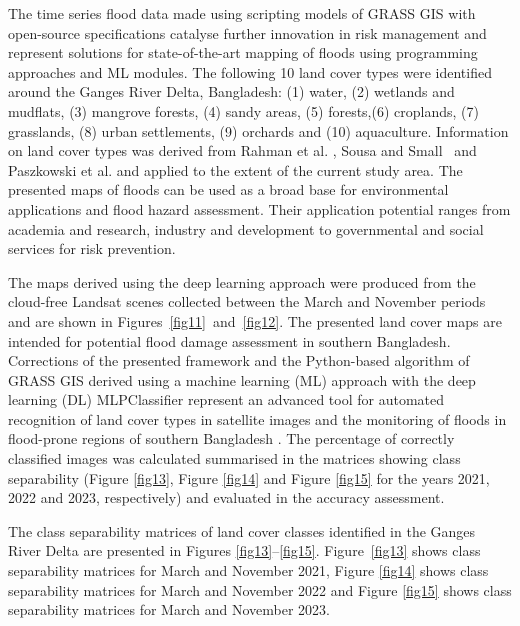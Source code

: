 \documentclass[water,article,accept,pdftex,oneauhor]{Definitions/mdpi}
\begin{document}
The time series flood data made using scripting models of GRASS GIS with open-source specifications catalyse further innovation in risk management and represent solutions for state-of-the-art mapping of floods using programming approaches and {ML} modules. The following 10 land cover types were identified around the Ganges River Delta, Bangladesh: (1) water, %
 (2) wetlands and mudflats, (3) mangrove forests, (4) sandy areas, (5) forests,(6) croplands, (7) grasslands, (8) urban settlements, (9) orchards and (10) aquaculture. Information on land cover types was derived from Rahman et al. \cite{Rahman2020}, Sousa and \mbox{Small \cite{rs13234799}} and Paszkowski et al. \cite{Paszkowski2021} and applied to the extent of the current study area. The presented maps of floods can be used as a broad base for environmental applications and flood hazard assessment. Their application potential ranges from academia and research, industry and development to governmental and social services for risk prevention. 

The maps derived using the deep learning approach were produced from the cloud-free Landsat scenes collected between the March and November periods and are shown in \mbox{Figures \ref{fig11} and \ref{fig12}.} The presented land cover maps are intended for potential flood damage assessment in southern Bangladesh. Corrections of the presented framework and the Python-based algorithm of GRASS GIS derived using a machine learning (ML) approach with the deep learning (DL) MLPClassifier represent an advanced tool for automated recognition of land cover types in satellite images and the monitoring of floods in flood-prone regions of southern Bangladesh%
. The percentage of correctly classified images was calculated summarised in the matrices showing class separability (Figure %
 \ref{fig13}, Figure \ref{fig14} and Figure \ref{fig15}
 for the years 2021, 2022 and 2023, respectively) and evaluated in the accuracy assessment. 

The class separability matrices of land cover classes identified in the Ganges River Delta are presented in {Figures }\ref{fig13}--\ref{fig15}. \mbox{Figure \ref{fig13}} shows class separability matrices for March and November 2021, Figure \ref{fig14} shows class separability matrices for March and November 2022 and Figure \ref{fig15} shows class separability matrices for March and November 2023. 
\end{document}

